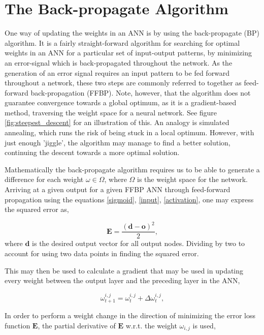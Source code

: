 \section{The Back-propagate Algorithm}\label{BP}

One way of updating the weights in an ANN is by using the back-propagate (BP) algorithm. It is a fairly straight-forward algorithm for searching for optimal weights in an ANN for a particular set of input-output patterns, by minimizing an error-signal which is back-propagated throughout the network. As the generation of an error signal requires an input pattern to be fed forward throughout a network, these two steps are commonly referred to together as feed-forward back-propagation (FFBP). Note, however, that the algorithm does not guarantee convergence towards a global optimum, as it is a gradient-based method, traversing the weight space for a neural network. See figure \ref{fig:steepest_descent} for an illustration of this. An analogy is simulated annealing, which runs the risk of being stuck in a local optimum. However, with just enough 'jiggle', the algorithm may manage to find a better solution, continuing the descent towards a more optimal solution.

Mathematically the back-propagate algorithm requires us to be able to generate a difference for each weight $\omega \in \Omega$, where $\Omega$ is the weight space for the network. Arriving at a given output for a given FFBP ANN through feed-forward propagation using the equations \eqref{sigmoid}, \eqref{input}, \eqref{activation}, one may express the squared error as,

\begin{equation}
    \textbf{E} = \frac{(\textbf{d} - \textbf{o})^2}{2},
\end{equation}
where $\textbf{d}$ is the desired output vector for all output nodes. Dividing by two to account for using two data points in finding the squared error.

This may then be used to calculate a gradient that may be used in updating every weight between the output layer and the preceding layer in the ANN,

\begin{equation}\label{weight_update}
    \omega_{t+1}^{i,j} = \omega_{t}^{i,j} + \Delta \omega_{t}^{i,j},
\end{equation}

In order to perform a weight change in the direction of minimizing the error loss function $\textbf{E}$, the partial derivative of $\textbf{E}$ w.r.t. the weight $\omega_{i,j}$ is used,

